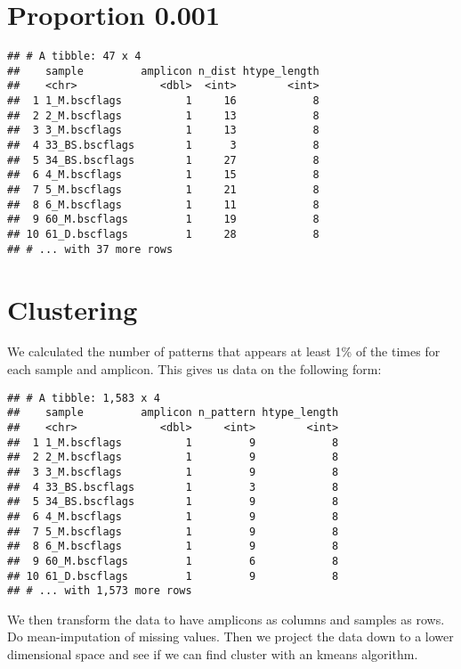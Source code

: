 \documentclass[
]{article}
\begin{document}
\hypertarget{proportion-0.001}{%
\section{Proportion 0.001}\label{proportion-0.001}}

\begin{verbatim}
## # A tibble: 47 x 4
##    sample         amplicon n_dist htype_length
##    <chr>             <dbl>  <int>        <int>
##  1 1_M.bscflags          1     16            8
##  2 2_M.bscflags          1     13            8
##  3 3_M.bscflags          1     13            8
##  4 33_BS.bscflags        1      3            8
##  5 34_BS.bscflags        1     27            8
##  6 4_M.bscflags          1     15            8
##  7 5_M.bscflags          1     21            8
##  8 6_M.bscflags          1     11            8
##  9 60_M.bscflags         1     19            8
## 10 61_D.bscflags         1     28            8
## # ... with 37 more rows
\end{verbatim}

\hypertarget{clustering}{%
\section{Clustering}\label{clustering}}

We calculated the number of patterns that appears at least 1\% of the
times for each sample and amplicon. This gives us data on the following
form:

\begin{verbatim}
## # A tibble: 1,583 x 4
##    sample         amplicon n_pattern htype_length
##    <chr>             <dbl>     <int>        <int>
##  1 1_M.bscflags          1         9            8
##  2 2_M.bscflags          1         9            8
##  3 3_M.bscflags          1         9            8
##  4 33_BS.bscflags        1         3            8
##  5 34_BS.bscflags        1         9            8
##  6 4_M.bscflags          1         9            8
##  7 5_M.bscflags          1         9            8
##  8 6_M.bscflags          1         9            8
##  9 60_M.bscflags         1         6            8
## 10 61_D.bscflags         1         9            8
## # ... with 1,573 more rows
\end{verbatim}

We then transform the data to have amplicons as columns and samples as
rows. Do mean-imputation of missing values. Then we project the data
down to a lower dimensional space and see if we can find cluster with an
kmeans algorithm.
\end{document}

